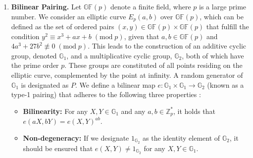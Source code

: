 \begin{enumerate}[label=(\arabic*)]
    \item \textbf{Bilinear Pairing.} Let $\mathbb{GF}(p)$ denote a finite field, where $p$ is a large prime number. We consider an elliptic curve $E_p(a,b)$ over $\mathbb{GF}(p)$, which can be defined as the set of ordered pairs $(x,y) \in \mathbb{GF}(p) \times \mathbb{GF}(p)$ that fulfill the condition $y^2 \equiv x^3 + ax + b \;(\text{mod}\; p)$, given that $a, b \in \mathbb{GF}(p)$ and $4a^3 + 27b^2 \not\equiv 0\; (\text{mod}\; p)$. This leads to the construction of an additive cyclic group, denoted $\mathbb{G}_1$, and a multiplicative cyclic group, $\mathbb{G}_2$, both of which have the prime order $p$. These groups are constituted of all points residing on the elliptic curve, complemented by the point at infinity. A random generator of $\mathbb{G}_1$ is designated as $P$. We define a bilinear map $e: \mathbb{G}_1 \times \mathbb{G}_1 \rightarrow \mathbb{G}_2$ (known as a type-1 pairing) that adheres to the following three properties \cite{bagga2023bilinear}:
\begin{itemize}
    \item \textbf{Bilinearity:} For any $X, Y \in \mathbb{G}_1$ and any $a, b \in \mathbb{Z}_p^\ast$, it holds that $e(aX, bY) = e(X, Y)^{ab}$.

\item \textbf{Non-degeneracy:} If we designate $1_{\mathbb{G}_2}$ as the identity element of $\mathbb{G}_2$, it should be ensured that $e(X, Y) \neq 1_{\mathbb{G}_2}$ for any $X, Y \in \mathbb{G}_1$.


\end{itemize}
\end{enumerate}
